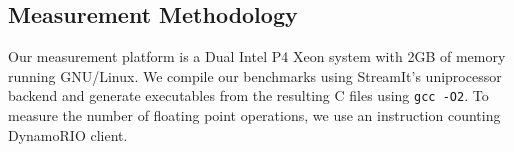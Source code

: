 \subsection{Measurement Methodology}



Our measurement platform is a Dual Intel P4 Xeon system with 2GB of
memory running GNU/Linux.  We compile our benchmarks using StreamIt's
uniprocessor backend and generate executables from the resulting C
files using {\tt gcc -O2}.  To measure the number of floating point
operations, we use an instruction counting DynamoRIO\cite{dynamo99}
client.

